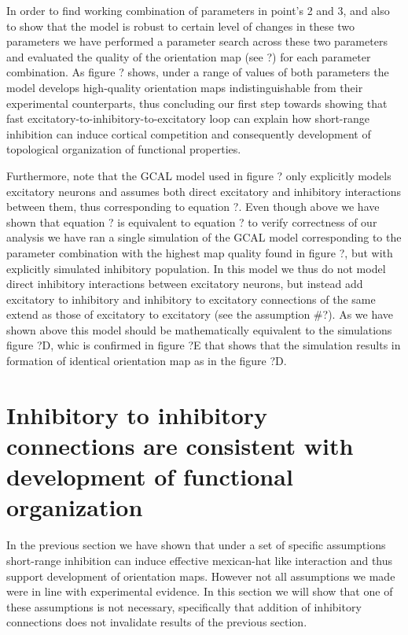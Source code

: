 \documentclass[a4paper,10pt]{article}
\begin{document}
In order to find working combination of parameters in point's 2 and 3, and also to show that the model is robust to certain level of changes
in these two parameters we have performed a parameter search across these two parameters and evaluated the quality of the orientation map (see ?) for each 
parameter combination. As figure ? shows, under a range of values of both parameters the model develops high-quality orientation maps indistinguishable
from their experimental counterparts, thus concluding our first step towards showing that fast excitatory-to-inhibitory-to-excitatory loop can explain 
how short-range inhibition can induce cortical competition and consequently development of topological organization of functional properties.

Furthermore, note that the GCAL model used in figure ? only explicitly models excitatory neurons and assumes both direct excitatory and inhibitory
interactions between them, thus corresponding to equation ?. Even though above we have shown that equation ? is equivalent to equation ? to verify 
correctness of our analysis we have ran a single simulation of the GCAL model corresponding to the parameter combination with the highest map 
quality found in figure ?, but with explicitly simulated inhibitory population. In this model we thus do not model direct inhibitory interactions
between excitatory neurons, but instead add excitatory to inhibitory and inhibitory to excitatory connections of the same extend as those of 
excitatory to excitatory (see the assumption \#?). As we have shown above this model should be mathematically equivalent to the simulations 
figure ?D, whic is confirmed in figure ?E that shows that the simulation results in formation of identical orientation map as in the figure ?D.



\section{Inhibitory to inhibitory connections are consistent with development of functional organization}

In the previous section we have shown that under a set of specific assumptions short-range inhibition can induce 
effective mexican-hat like interaction and thus support development of orientation maps. However not all assumptions we 
made were in line with experimental evidence. In this section we will show that one of these assumptions is not necessary, 
specifically that addition of inhibitory connections does not invalidate results of the previous section. 
\end{document}
